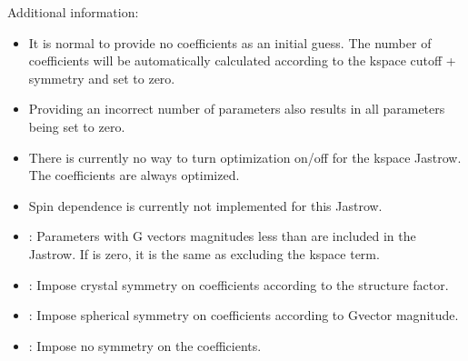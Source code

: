 \documentclass[letterpaper,10pt,english]{sphinxmanual}
\begin{document}
Additional information:
\begin{itemize}
\item {} 
It is normal to provide no coefficients as an initial guess. The
number of coefficients will be automatically calculated according to
the k\sphinxhyphen{}space cutoff + symmetry and set to zero.

\item {} 
Providing an incorrect number of parameters also results in all
parameters being set to zero.

\item {} 
There is currently no way to turn optimization on/off for the k\sphinxhyphen{}space
Jastrow. The coefficients are always optimized.

\item {} 
Spin dependence is currently not implemented for this Jastrow.

\item {} 
: Parameters with G vectors magnitudes less than  are
included in the Jastrow. If  is zero, it is the same as
excluding the k\sphinxhyphen{}space term.

\item {} 
: Impose crystal symmetry on coefficients
according to the structure factor.

\item {} 
: Impose spherical symmetry on coefficients
according to G\sphinxhyphen{}vector magnitude.

\item {} 
: Impose no symmetry on the coefficients.

\end{itemize}
\def\sphinxLiteralBlockLabel{\label{\detokenize{intro_wavefunction:listing-10}}}
\end{document}
